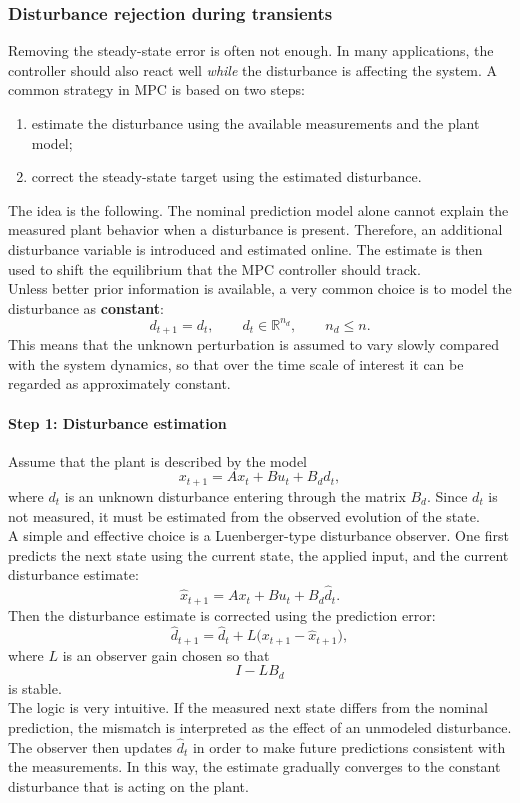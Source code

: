 \subsubsection{Disturbance rejection during transients}

Removing the steady-state error is often not enough. In many applications, the controller should also react well \emph{while} the disturbance is affecting the system. A common strategy in MPC is based on two steps:
\begin{enumerate}
    \item estimate the disturbance using the available measurements and the plant model;
    \item correct the steady-state target using the estimated disturbance.
\end{enumerate}
The idea is the following. The nominal prediction model alone cannot explain the measured plant behavior when a disturbance is present. Therefore, an additional disturbance variable is introduced and estimated online. The estimate is then used to shift the equilibrium that the MPC controller should track.\\
Unless better prior information is available, a very common choice is to model the disturbance as \textbf{constant}:
\[
d_{t+1}=d_t,
\qquad d_t \in \mathbb{R}^{n_d},
\qquad n_d \le n.
\]
This means that the unknown perturbation is assumed to vary slowly compared with the system dynamics, so that over the time scale of interest it can be regarded as approximately constant.

\paragraph{Step 1: Disturbance estimation}
Assume that the plant is described by the model
\[
x_{t+1}=Ax_t+Bu_t+B_d d_t,
\]
where $d_t$ is an unknown disturbance entering through the matrix $B_d$. Since $d_t$ is not measured, it must be estimated from the observed evolution of the state.\\
A simple and effective choice is a Luenberger-type disturbance observer. One first predicts the next state using the current state, the applied input, and the current disturbance estimate:
\[
\hat x_{t+1}=Ax_t+Bu_t+B_d \hat d_t.
\]
Then the disturbance estimate is corrected using the prediction error:
\[
\hat d_{t+1}
=
\hat d_t + L\bigl(x_{t+1}-\hat x_{t+1}\bigr),
\]
where $L$ is an observer gain chosen so that
\[
I-LB_d
\]
is stable.\\
The logic is very intuitive. If the measured next state differs from the nominal prediction, the mismatch is interpreted as the effect of an unmodeled disturbance. The observer then updates $\hat d_t$ in order to make future predictions consistent with the measurements. In this way, the estimate gradually converges to the constant disturbance that is acting on the plant.

